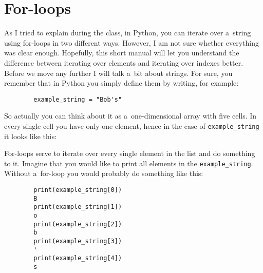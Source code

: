 \documentclass{article}
\begin{document}
\section*{For-loops}
As I tried to explain during the class, in Python, you can iterate over a~string using for-loops in two different ways. However, I am not sure whether everything was clear enough. Hopefully, this short manual will let you understand the difference between iterating over elements and iterating over indexes better. Before we move any further I will talk a~bit about strings. For sure, you remember that in Python you simply define them by writing, for example: 
\begin{center}
    \begin{verbatim}
        example_string = "Bob's"
    \end{verbatim}
\end{center}
    
\noindent So actually you can think about it as a~one-dimensional array with five cells. In every single cell you have only one element, hence in the case of \texttt{example_string} it looks like this:
\begin{center}
\end{center}
\noindent For-loops serve to iterate over every single element in the list and do something to it. Imagine that you would like to print all elements in the \texttt{example_string}. Without a~for-loop you would probably do something like this:

\begin{center}
    \begin{verbatim}
        print(example_string[0])
        B
        print(example_string[1])
        o
        print(example_string[2])
        b
        print(example_string[3])
        '
        print(example_string[4])
        s
    \end{verbatim}
\end{center}
\end{document}
